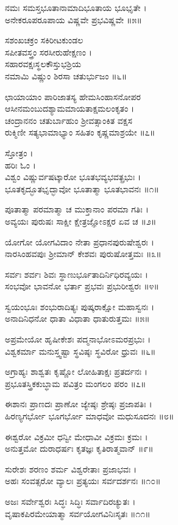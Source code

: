 ನಮಃ ಸಮಸ್ತಭೂತಾನಾಮಾದಿಭೂತಾಯ ಭೂಭೃತೇ ।\\
ಅನೇಕರೂಪರೂಪಾಯ ವಿಷ್ಣವೇ ಪ್ರಭವಿಷ್ಣವೇ ॥೫॥

ಸಶಂಖಚಕ್ರಂ ಸಕಿರೀಟಕುಂಡಲ\\
ಸಪೀತವಸ್ತ್ರಂ ಸರಸೀರುಹೇಕ್ಷಣಂ ।\\
ಸಹಾರವಕ್ಷಃಸ್ಥಲಕೌಸ್ತುಭಶ್ರಿಯ\\
ನಮಾಮಿ ವಿಷ್ಣುಂ ಶಿರಸಾ ಚತುರ್ಭುಜಂ ॥೬॥

ಛಾಯಾಯಾಂ ಪಾರಿಜಾತಸ್ಯ ಹೇಮಸಿಂಹಾಸನೋಪರ\\
ಆಸೀನಮಂಬುದಶ್ಯಾಮಮಾಯತಾಕ್ಷಮಲಂಕೃತಂ ।\\
ಚಂದ್ರಾನನಂ ಚತುರ್ಬಾಹುಂ ಶ್ರೀವತ್ಸಾಂಕಿತ ವಕ್ಷಸ\\
ರುಕ್ಮಿಣೀ ಸತ್ಯಭಾಮಾಭ್ಯಾಂ ಸಹಿತಂ ಕೃಷ್ಣಮಾಶ್ರಯೇ ॥೭॥


ಸ್ತೋತ್ರಂ ।\\
ಹರಿಃ ಓಂ ।\\
ವಿಶ್ವಂ ವಿಷ್ಣುರ್ವಷಟ್ಕಾರೋ ಭೂತಭವ್ಯಭವತ್ಪ್ರಭುಃ ।\\
ಭೂತಕೃದ್ಭೂತಭೃದ್ಭಾವೋ ಭೂತಾತ್ಮಾ ಭೂತಭಾವನಃ ॥೧॥

ಪೂತಾತ್ಮಾ ಪರಮಾತ್ಮಾ ಚ ಮುಕ್ತಾನಾಂ ಪರಮಾ ಗತಿಃ ।\\
ಅವ್ಯಯಃ ಪುರುಷಃ ಸಾಕ್ಷೀ ಕ್ಷೇತ್ರಜ್ಞೋಽಕ್ಷರ ಏವ ಚ ॥೨॥

ಯೋಗೋ ಯೋಗವಿದಾಂ ನೇತಾ ಪ್ರಧಾನಪುರುಷೇಶ್ವರಃ ।\\
ನಾರಸಿಂಹವಪುಃ ಶ್ರೀಮಾನ್ ಕೇಶವಃ ಪುರುಷೋತ್ತಮಃ ॥೩॥

ಸರ್ವಃ ಶರ್ವಃ ಶಿವಃ ಸ್ಥಾಣುರ್ಭೂತಾದಿರ್ನಿಧಿರವ್ಯಯಃ ।\\
ಸಂಭವೋ ಭಾವನೋ ಭರ್ತಾ ಪ್ರಭವಃ ಪ್ರಭುರೀಶ್ವರಃ ॥೪॥

ಸ್ವಯಂಭೂಃ ಶಂಭುರಾದಿತ್ಯಃ ಪುಷ್ಕರಾಕ್ಷೋ ಮಹಾಸ್ವನಃ ।\\
ಅನಾದಿನಿಧನೋ ಧಾತಾ ವಿಧಾತಾ ಧಾತುರುತ್ತಮಃ ॥೫॥

ಅಪ್ರಮೇಯೋ ಹೃಷೀಕೇಶಃ ಪದ್ಮನಾಭೋಽಮರಪ್ರಭುಃ ।\\
ವಿಶ್ವಕರ್ಮಾ ಮನುಸ್ತ್ವಷ್ಟಾ ಸ್ಥವಿಷ್ಠಃ ಸ್ಥವಿರೋ ಧ್ರುವಃ ॥೬॥

ಅಗ್ರಾಹ್ಯಃ ಶಾಶ್ವತಃ ಕೃಷ್ಣೋ ಲೋಹಿತಾಕ್ಷಃ ಪ್ರತರ್ದನಃ ।\\
ಪ್ರಭೂತಸ್ತ್ರಿಕಕುಬ್ಧಾಮ ಪವಿತ್ರಂ ಮಂಗಲಂ ಪರಂ ॥೭॥

ಈಶಾನಃ ಪ್ರಾಣದಃ ಪ್ರಾಣೋ ಜ್ಯೇಷ್ಠಃ ಶ್ರೇಷ್ಠಃ ಪ್ರಜಾಪತಿಃ ।\\
ಹಿರಣ್ಯಗರ್ಭೋ ಭೂಗರ್ಭೋ ಮಾಧವೋ ಮಧುಸೂದನಃ ॥೮॥

ಈಶ್ವರೋ ವಿಕ್ರಮೀ ಧನ್ವೀ ಮೇಧಾವೀ ವಿಕ್ರಮಃ ಕ್ರಮಃ ।\\
ಅನುತ್ತಮೋ ದುರಾಧರ್ಷಃ ಕೃತಜ್ಞಃ ಕೃತಿರಾತ್ಮವಾನ್ ॥೯॥

ಸುರೇಶಃ ಶರಣಂ ಶರ್ಮ ವಿಶ್ವರೇತಾಃ ಪ್ರಜಾಭವಃ ।\\
ಅಹಃ ಸಂವತ್ಸರೋ ವ್ಯಾಲಃ ಪ್ರತ್ಯಯಃ ಸರ್ವದರ್ಶನಃ ॥೧೦॥

ಅಜಃ ಸರ್ವೇಶ್ವರಃ ಸಿದ್ಧಃ ಸಿದ್ಧಿಃ ಸರ್ವಾದಿರಚ್ಯುತಃ ।\\
ವೃಷಾಕಪಿರಮೇಯಾತ್ಮಾ ಸರ್ವಯೋಗವಿನಿಃಸೃತಃ ॥೧೧॥

